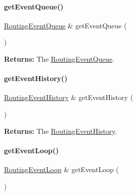 \paragraph{\texorpdfstring{get\+Event\+Queue()}{getEventQueue()}}
{\footnotesize\ttfamily \hyperlink{classKite_1_1RoutingEventQueue}{Routing\+Event\+Queue} \& get\+Event\+Queue (\begin{DoxyParamCaption}{ }\end{DoxyParamCaption})\hspace{0.3cm}{\ttfamily [inline]}}

{\bfseries Returns\+:} The \hyperlink{classKite_1_1RoutingEventQueue}{Routing\+Event\+Queue}. \mbox{\label{classKite_1_1NegociateWindow_a990d738cf85fa016589edaa08d736d4f}} 
\paragraph{\texorpdfstring{get\+Event\+History()}{getEventHistory()}}
{\footnotesize\ttfamily \hyperlink{classKite_1_1RoutingEventHistory}{Routing\+Event\+History} \& get\+Event\+History (\begin{DoxyParamCaption}{ }\end{DoxyParamCaption})\hspace{0.3cm}{\ttfamily [inline]}}

{\bfseries Returns\+:} The \hyperlink{classKite_1_1RoutingEventHistory}{Routing\+Event\+History}. \mbox{\label{classKite_1_1NegociateWindow_a9a41d40e5e378b9bcb99048262ec15a6}} 
\paragraph{\texorpdfstring{get\+Event\+Loop()}{getEventLoop()}}
{\footnotesize\ttfamily \hyperlink{classKite_1_1RoutingEventLoop}{Routing\+Event\+Loop} \& get\+Event\+Loop (\begin{DoxyParamCaption}{ }\end{DoxyParamCaption})\hspace{0.3cm}{\ttfamily [inline]}}

